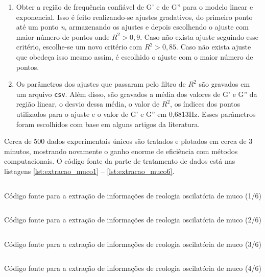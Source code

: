 		\begin{enumerate}
			\item Obter a região de frequência confiável de G' e de G'' para o modelo linear e exponencial. Isso é feito realizando-se ajustes gradativos, do primeiro ponto até um ponto \emph{n}, armazenando os ajustes e depois escolhendo o ajuste com maior número de pontos onde \(R^2 > 0{,}9\). Caso não exista ajuste seguindo esse critério, escolhe-se um novo critério com \(R^2 > 0,85\). Caso não exista ajuste que obedeça isso mesmo assim, é escolhido o ajuste com o maior número de pontos. 
			\item Os parâmetros dos ajustes que passaram pelo filtro de \(R^2\) são gravados em um arquivo \texttt{csv}. Além disso, são gravados a média dos valores de G' e G'' da região linear, o desvio dessa média, o valor de \(R^2\), os índices dos pontos utilizados para o ajuste e o valor de G' e G'' em 0,6813Hz. Esses parâmetros foram escolhidos com base em alguns artigos da literatura. %
		\end{enumerate}
		
		Cerca de 500 dados experimentais únicos são tratados e plotados em cerca de 3 minutos, mostrando novamente o ganho enorme de eficiência com métodos computacionais. O código fonte da parte de tratamento de dados está nas listagens \ref{lst:extracao_muco1} -- \ref{lst:extracao_muco6}.
		
		\begin{listing}[h]
			\inputminted{python}{./python/extracao_muco1.py}
			\caption{Código fonte para a extração de informações de reologia oscilatória de muco (1/6)} 
			\label{lst:extracao_muco1}
		\end{listing}
		
		\begin{listing}[h]
			\inputminted{python}{./python/extracao_muco2.py}
			\caption{Código fonte para a extração de informações de reologia oscilatória de muco (2/6)} 
			\label{lst:extracao_muco2}
		\end{listing}
		
		\begin{listing}[h]
			\inputminted{python}{./python/extracao_muco3.py}
			\caption{Código fonte para a extração de informações de reologia oscilatória de muco (3/6)} 
			\label{lst:extracao_muco3}
		\end{listing}
		
		\begin{listing}[h]
			\inputminted{python}{./python/extracao_muco4.py}
			\caption{Código fonte para a extração de informações de reologia oscilatória de muco (4/6)} 
			\label{lst:extracao_muco4}
		\end{listing}
		
